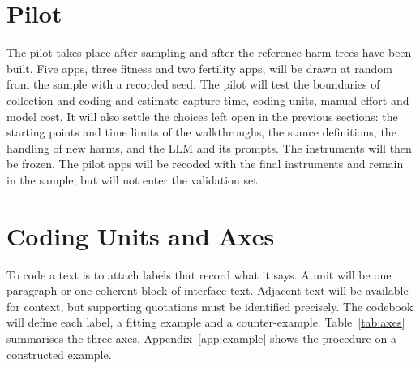 \section{Pilot} The pilot takes place after sampling and after the reference
harm trees have been built. Five apps, three fitness and two fertility apps,
will be drawn at random from the sample with a recorded seed. The pilot will
test the boundaries of collection and coding and estimate capture time, coding
units, manual effort and model cost. It will also settle the choices left open
in the previous sections: the starting points and time limits of the
walkthroughs, the stance definitions, the handling of new harms, and the LLM
and its prompts. The instruments will then be frozen. The pilot apps will be
recoded with the final instruments and remain in the sample, but will not
enter the validation set.

\section{Coding Units and Axes} To code a text is to attach labels that
record what it says. A unit will be one paragraph or one coherent block of
interface text. Adjacent text will be available for context, but supporting quotations must
be identified precisely. The codebook will define each label, a fitting
example and a counter-example. Table~\ref{tab:axes} summarises the three axes.
Appendix~\ref{app:example} shows the procedure on a constructed example.

